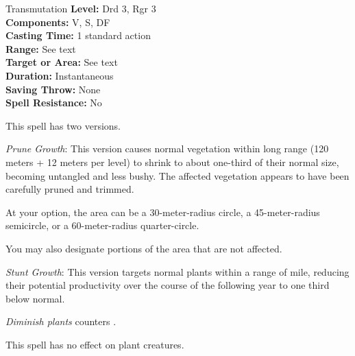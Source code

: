 {Transmutation}
{
	\textbf{Level:}
	Drd 3, Rgr 3\\
	\textbf{Components:}
	V, S, DF\\
	\textbf{Casting Time:}
	1 standard action\\
	\textbf{Range:}
	See text\\
	\textbf{Target or Area:}
	See text\\
	\textbf{Duration:}
	Instantaneous\\
	\textbf{Saving Throw:}
	None\\
	\textbf{Spell Resistance:}
	No\\
}
{
	This spell has two versions.

	\textit{Prune Growth}:
	This version causes normal vegetation within long range (120 meters + 12 meters per level) to shrink to about one-third of their normal size, becoming untangled and less bushy. The affected vegetation appears to have been carefully pruned and trimmed.

	At your option, the area can be a 30-meter-radius circle, a 45-meter-radius semicircle, or a 60-meter-radius quarter-circle.

	You may also designate portions of the area that are not affected.

	\textit{Stunt Growth}:
	This version targets normal plants within a range of \onehalf mile, reducing their potential productivity over the course of the following year to one third below normal.

	\emph{Diminish plants} counters .

	This spell has no effect on plant creatures.

}
